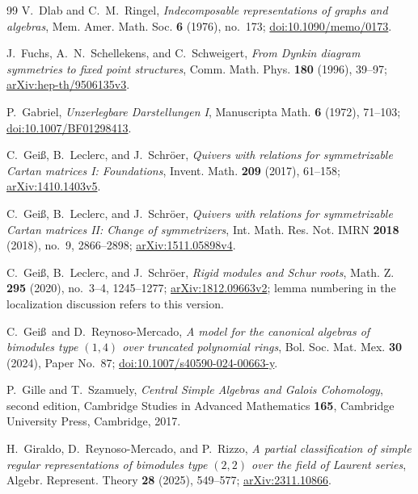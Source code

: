 \documentclass[11pt, reqno]{amsart}
\numberwithin{equation}{section}
\theoremstyle{definition}
\theoremstyle{remark}
\begin{document}
\begin{thebibliography}{99}
V.~Dlab and C.~M.~Ringel,
\emph{Indecomposable representations of graphs and algebras},
Mem. Amer. Math. Soc. \textbf{6} (1976), no.~173;
\href{https://doi.org/10.1090/memo/0173}{doi:10.1090/memo/0173}.


J.~Fuchs, A.~N.~Schellekens, and C.~Schweigert,
\emph{From Dynkin diagram symmetries to fixed point structures},
Comm. Math. Phys. \textbf{180} (1996), 39--97;
\href{https://arxiv.org/abs/hep-th/9506135v3}{arXiv:hep-th/9506135v3}.

P.~Gabriel,
\emph{Unzerlegbare Darstellungen I}, Manuscripta Math. \textbf{6}
(1972), 71--103;
\href{https://doi.org/10.1007/BF01298413}{doi:10.1007/BF01298413}.

C.~Gei\ss, B.~Leclerc, and J.~Schr\"oer,
\emph{Quivers with relations for symmetrizable Cartan matrices I:
Foundations}, Invent. Math. \textbf{209} (2017), 61--158;
\href{https://arxiv.org/abs/1410.1403v5}{arXiv:1410.1403v5}.

C.~Gei\ss, B.~Leclerc, and J.~Schr\"oer,
\emph{Quivers with relations for symmetrizable Cartan matrices II:
Change of symmetrizers},
Int. Math. Res. Not. IMRN \textbf{2018} (2018), no.~9, 2866--2898;
\href{https://arxiv.org/abs/1511.05898v4}{arXiv:1511.05898v4}.

C.~Gei\ss, B.~Leclerc, and J.~Schr\"oer,
\emph{Rigid modules and Schur roots},
Math. Z. \textbf{295} (2020), no.~3--4, 1245--1277;
\href{https://arxiv.org/abs/1812.09663v2}{arXiv:1812.09663v2};
lemma numbering in the localization discussion refers to this version.

C.~Gei\ss\ and D.~Reynoso-Mercado,
\emph{A model for the canonical algebras of bimodules type $(1,4)$
over truncated polynomial rings}, Bol. Soc. Mat. Mex. \textbf{30}
(2024), Paper No.~87;
\href{https://doi.org/10.1007/s40590-024-00663-y}{doi:10.1007/s40590-024-00663-y}.

P.~Gille and T.~Szamuely,
\emph{Central Simple Algebras and Galois Cohomology},
second edition, Cambridge Studies in Advanced Mathematics \textbf{165},
Cambridge University Press, Cambridge, 2017.

H.~Giraldo, D.~Reynoso-Mercado, and P.~Rizzo,
\emph{A partial classification of simple regular representations of
bimodules type $(2,2)$ over the field of Laurent series},
Algebr. Represent. Theory \textbf{28} (2025), 549--577;
\href{https://arxiv.org/abs/2311.10866}{arXiv:2311.10866}.


\end{thebibliography}
\end{document}
